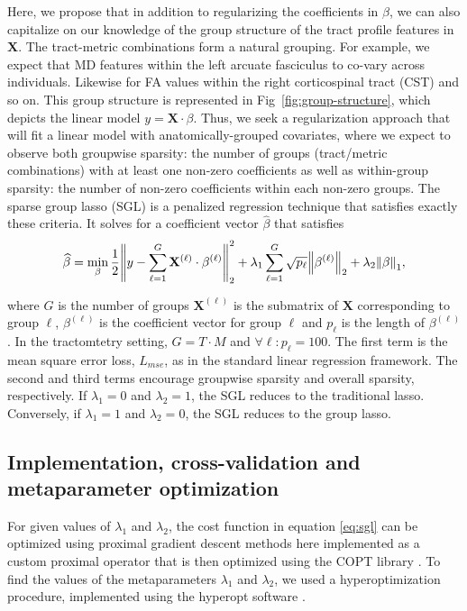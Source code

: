 Here, we propose that in addition to regularizing the coefficients in $\beta$,
we can also capitalize on our knowledge of the group structure of the tract
profile features in $\mathbf{X}$. The tract-metric combinations form a natural
grouping. For example, we expect that MD features within the left arcuate
fasciculus to co-vary across individuals. Likewise for FA values within the
right corticospinal tract (CST) and so on. This group structure is represented
in Fig~\ref{fig:group-structure}, which depicts the linear model $y = \mathbf{X}
\cdot \beta$. Thus, we seek a regularization approach that will fit a linear
model with anatomically-grouped covariates, where we expect to observe both
groupwise sparsity: the number of groups (tract/metric combinations) with at
least one non-zero coefficients as well as within-group sparsity: the number of
non-zero coefficients within each non-zero groups. The sparse group lasso (SGL)
is a penalized regression technique that satisfies exactly these
criteria\cite{simon2013sparse}. It solves for a coefficient vector
$\widehat{\beta}$ that satisfies
\begin{equation}
    \widehat{\beta} = \min_\beta \frac{1}{2}
    \norm*{y - \displaystyle \sum_{\ell = 1}^{G} \mathbf{X}^{(\ell)} \cdot \beta^{(\ell)}}_2^2
    + \lambda_1 \displaystyle \sum_{\ell = 1}^{G} \sqrt{p_\ell} \norm*{\beta^{(\ell)}}_2
    + \lambda_2 \norm*{\beta}_1,
    \label{eq:sgl}
\end{equation}

where $G$ is the number of groups $\mathbf{X}^{(\ell)}$ is the submatrix of
$\mathbf{X}$ corresponding to group $\ell$, $\beta^{(\ell)}$ is the coefficient
vector for group $\ell$ and $p_\ell$ is the length of $\beta^{(\ell)}$. In the
tractomtetry setting, $G = T \cdot M$ and $\forall \ell: p_\ell = 100$. The
first term is the mean square error loss, $L_{mse}$, as in the standard linear
regression framework. The second and third terms encourage groupwise sparsity
and overall sparsity, respectively. If $\lambda_1 = 0$ and $\lambda_2 = 1$, the
SGL reduces to the traditional lasso\cite{tibshirani1996regression}. Conversely,
if $\lambda_1 = 1$ and $\lambda_2 = 0$, the SGL reduces to the group
lasso\cite{yuan2006model}.

\subsection*{Implementation, cross-validation and metaparameter optimization}

For given values of $\lambda_1$ and $\lambda_2$, the cost function in equation
\ref{eq:sgl} can be optimized using proximal gradient descent methods
\cite{parikh2014proximal} here implemented as a custom proximal operator that is
then optimized using the COPT library . To
find the values of the metaparameters $\lambda_1$ and $\lambda_2$, we used a
hyperoptimization procedure, implemented using the hyperopt software
\cite{Bergstra_2015}. 

